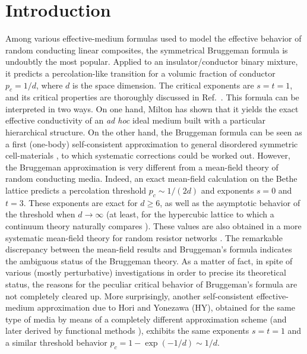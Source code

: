 \vskip1cm

\section{Introduction}
Among various effective-medium formulas used to model the effective
behavior of random conducting linear composites, the symmetrical
Bruggeman formula \cite{BRUG35,LAND52} is undoubtly the most
popular. Applied to an insulator/conductor binary mixture, it predicts
a percolation-like transition \cite{KIRK71,CLER90,STAU92,SAHI98} for a
volumic fraction of conductor $p_c=1/d$, where $d$ is the space
dimension. The critical exponents are $s=t=1$, and its critical properties
are thoroughly discussed in Ref.\ \cite{CLER90}. This formula can be
interpreted in two ways. On one hand, Milton has shown \cite{MILT85} that it
yields the exact effective conductivity of an {\it ad hoc} ideal medium
built with a particular hierarchical structure. On the other hand, the
Bruggeman formula can be seen as a first (one-body) self-consistent
approximation to general disordered symmetric cell-materials
\cite{MILL69}, to which systematic corrections could be worked
out. However, the Bruggeman approximation is very different from a
mean-field theory of random conducting media. Indeed, an exact
mean-field calculation on the Bethe lattice \cite{STIN73,STRA74} predicts a
percolation threshold $p_c\sim 1/(2d)$ and exponents $s=0$ and
$t=3$. These exponents are exact for $d\geq 6$, as well as the
asymptotic behavior of the threshold when $d\to\infty$ (at least, for
the hypercubic lattice \cite{STAU92} to which a continuum theory
naturally compares \cite{NOTE1}). These values are also obtained in a
more systematic mean-field theory for random resistor networks
\cite{STEP77}.
The remarkable discrepancy between the mean-field results and
Bruggeman's formula indicates the ambiguous status of the Bruggeman
theory. As a matter of fact, in spite of various (mostly perturbative)
investigations \cite{HORI75,BERG81,LUCK91} in order to precise its
theoretical status, the reasons for the peculiar critical behavior of
Bruggeman's formula are not completely cleared up.
More surprisingly, another
self-consistent effective-medium approximation \cite{HORI75,HORI77} due
to Hori and Yonezawa (HY), obtained for the same type of media by means
of a completely different approximation scheme (and later derived by
functional methods \cite{BART93}), exhibits the same exponents $s=t=1$
and a similar threshold behavior $p_c=1-\exp(-1/d)\sim 1/d$.


